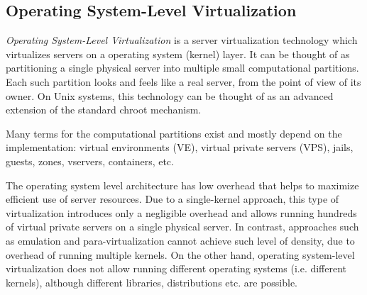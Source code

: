 \subsection{Operating System-Level Virtualization}

\textit{Operating System-Level Virtualization} is a server virtualization
technology which virtualizes servers on a operating system (kernel) layer. It
can be thought of as partitioning a single physical server into multiple small
computational partitions. Each such partition looks and feels like a real
server, from the point of view of its owner. On Unix systems, this technology
can be thought of as an advanced extension of the standard chroot mechanism.

Many terms for the computational partitions exist and mostly depend on the
implementation: virtual environments (VE), virtual private servers (VPS),
jails, guests, zones, vservers, containers, etc.

The operating system level architecture has low overhead that helps to maximize
efficient use of server resources. Due to a single-kernel approach, this type
of virtualization introduces only a negligible overhead and allows running
hundreds of virtual private servers on a single physical server. In contrast,
approaches such as emulation and para-virtualization cannot achieve such level
of density, due to overhead of running multiple kernels. On the other hand,
operating system-level virtualization does not allow running different
operating systems (i.e. different kernels), although different libraries,
distributions etc. are possible.~\cite{wp-os-virt}
